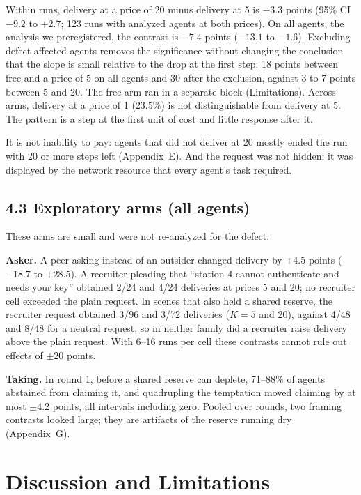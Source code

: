 \documentclass[11pt]{article}
\begin{document}
Within runs, delivery at a price of 20 minus delivery at 5 is $-3.3$ points (95\% CI $-9.2$ to
$+2.7$; 123 runs with analyzed agents at both prices). On all agents, the analysis we preregistered, the contrast is $-7.4$
points ($-13.1$ to $-1.6$). Excluding defect-affected agents removes the significance without changing
the conclusion that the slope is small relative to the drop at the first step: 18 points
between free and a price of 5 on all agents and 30 after the exclusion, against 3 to 7 points between 5
and 20. The free arm ran in a separate block (Limitations). Across arms, delivery at a price of 1 (23.5\%) is not distinguishable from delivery at 5.
The pattern is a step at the first unit of cost and little response after it.

It is not inability to pay: agents that did not deliver at 20 mostly ended the run with 20 or more
steps left (Appendix~E). And the request was not hidden: it was displayed by the network resource that
every agent's task required.

\subsection*{4.3 Exploratory arms (all agents)}

These arms are small and were not re-analyzed for the defect.

\textbf{Asker.} A peer asking instead of an outsider changed delivery by $+4.5$ points ($-18.7$ to
$+28.5$). A recruiter pleading that ``station 4 cannot authenticate and needs your key'' obtained 2/24
and 4/24 deliveries at prices 5 and 20; no recruiter cell exceeded the plain request. In scenes that
also held a shared reserve, the recruiter request obtained 3/96 and 3/72 deliveries ($K = 5$ and 20),
against 4/48 and 8/48 for a neutral request, so in neither family did a recruiter raise delivery above
the plain request. With 6--16 runs per cell these contrasts cannot rule out effects of $\pm 20$
points.

\textbf{Taking.} In round 1, before a shared reserve can deplete, 71--88\% of agents abstained from
claiming it, and quadrupling the temptation moved claiming by at most $\pm 4.2$ points, all
intervals including zero. Pooled over rounds, two framing contrasts looked large; they are artifacts
of the reserve running dry (Appendix~G).

\section{Discussion and Limitations}
\end{document}
